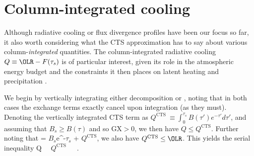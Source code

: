 \documentclass[10pt]{article}
\newcommand{\Qcts}{\ensuremath{Q^\mathrm{CTS}}}
\newcommand{\tauk}{\ensuremath{\tau_k}}
\newcommand{\taus}{\ensuremath{\tau_s}}
\newcommand{\Bs}{\ensuremath{B_s}}
\newcommand{\GX}{\ensuremath{\mathrm{GX}}}
\newcommand{\EXbelow}{\ensuremath{\mathrm{EX_{below}}}}
\newcommand{\EXabove}{\ensuremath{\mathrm{EX_{above}}}}
\newcommand{\kQ}{\ensuremath{k_Q}}
\begin{document}
%

 \section{Column-integrated cooling}
 Although radiative cooling or flux divergence profiles have been our focus so far, it also worth considering what the CTS approximation has to say about various column-\emph{integrated} quantities. The column-integrated radiative cooling
 $  Q \equiv \OLR   - F(\taus)$ is of particular interest, given its role in the atmospheric energy budget and the constraints it then places on latent heating and precipitation \citep[e.g.][and references therein]{jeevanjee2018}. 
 
 We begin by vertically integrating either decomposition  or , noting that in both cases the exchange terms exactly cancel  upon integration (as they must). Denoting the vertically integrated CTS term as
$ \Qcts \ \equiv \int_0^{\taus} B(\tau')e^{-\tau'} d\tau'$, and assuming that $\Bs \geq B(\tau)$ and so $\GX>0$, we then have $Q \leq \Qcts$. Further noting that 
\beqn
	\OLR = \Bs e^{-\taus} + \Qcts,
	\label{olr_cts}
\eeqn
 we also have $\Qcts \leq \OLR$. This yields  the serial inequality
\beqn
        Q \ \leq\  \Qcts \ \leq  \ \OLR \ .
        \label{Q_law}
        \n
\eeqn
\end{document}
